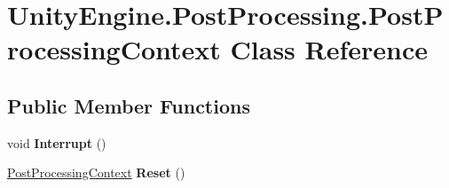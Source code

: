 \hypertarget{class_unity_engine_1_1_post_processing_1_1_post_processing_context}{}\section{Unity\+Engine.\+Post\+Processing.\+Post\+Processing\+Context Class Reference}
\label{class_unity_engine_1_1_post_processing_1_1_post_processing_context}
\subsection*{Public Member Functions}
\begin{DoxyCompactItemize}
\item 
\mbox{\label{class_unity_engine_1_1_post_processing_1_1_post_processing_context_a5576527ed48192d867c94726398fd83f}} 
void {\bfseries Interrupt} ()
\item 
\mbox{\label{class_unity_engine_1_1_post_processing_1_1_post_processing_context_ab29cec74ac7c25ed7793d1d4fcb82271}} 
\mbox{\hyperlink{class_unity_engine_1_1_post_processing_1_1_post_processing_context}{Post\+Processing\+Context}} {\bfseries Reset} ()
\end{DoxyCompactItemize}
